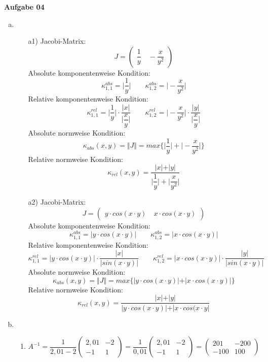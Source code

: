 \documentclass[a4paper,10pt]{article}
\begin{document}
	\newpage
	\textbf{Aufgabe 04}\\
	\begin{enumerate}[a)]
		\item
		\begin{enumerate}
			\item[a1)]
			Jacobi-Matrix:
			\[
			J = 
			\begin{pmatrix}
			\dfrac{1}{y} \quad -\dfrac{x}{y^2}
			\end{pmatrix}
			\]
			Absolute komponentenweise Kondition:
			\[
			\kappa^{abs}_{1,1} = \Big\vert \dfrac{1}{y} \Big\vert \quad\quad \kappa^{abs}_{1,2} = \Big\vert -\dfrac{x}{y^2} \Big \vert
			\]
			Relative komponentenweise Kondition:
			\[
			\kappa^{rel}_{1,1} = \Big\vert \dfrac{1}{y}\Big\vert \cdot \dfrac{\vert x \vert}{\Big \vert \dfrac{x}{y} \Big\vert} \quad\quad \kappa^{rel}_{1,2} = \Big\vert -\dfrac{x}{y^2}\Big\vert \cdot \dfrac{\vert y \vert}{\Big \vert \dfrac{x}{y} \Big\vert}
			\]
			Absolute normweise Kondition:
			\[
			\kappa_{abs}(x,y) = \Vert J \Vert = max\{\Big\vert \dfrac{1}{y} \Big\vert + \Big\vert -\dfrac{x}{y^2} \Big \vert\}
			\]
			Relative normweise Kondition:
			\[
			\kappa_{rel}(x,y) = \dfrac{\vert x \vert + \vert y \vert}{\Big\vert \dfrac{1}{y} \Big\vert + \Big\vert \dfrac{x}{y^2} \Big \vert}
			\]
			\item[a2)]
			Jacobi-Matrix:
			\[
			J = 
			\begin{pmatrix}
			y \cdot cos(x \cdot y) \quad x \cdot cos(x \cdot y)
			\end{pmatrix}
			\]
			Absolute komponentenweise Kondition:
			\[
			\kappa^{abs}_{1,1} = \Big\vert y \cdot cos(x \cdot y) \Big\vert \quad\quad \kappa^{abs}_{1,2} = \Big\vert x \cdot cos(x \cdot y) \Big \vert
			\]
			Relative komponentenweise Kondition:
			\[
			\kappa^{rel}_{1,1} = \Big\vert y \cdot cos(x \cdot y) \Big\vert \cdot \dfrac{\vert x \vert}{\Big \vert sin(x \cdot y) \Big\vert} \quad\quad \kappa^{rel}_{1,2} = \Big\vert x \cdot cos(x \cdot y) \Big\vert \cdot \dfrac{\vert y \vert}{\Big \vert sin(x \cdot y) \Big\vert}
			\]
			Absolute normweise Kondition:
			\[
			\kappa_{abs}(x,y) = \Vert J \Vert = max\{\vert y \cdot cos(x \cdot y)\vert + \vert x \cdot cos(x \cdot y) \vert\}
			\]
			Relative normweise Kondition:
			\[
			\kappa_{rel}(x,y) = \dfrac{\vert x \vert + \vert y \vert}{\vert y \cdot cos(x \cdot y) \vert + \vert x \cdot cos(x \cdot y \vert}
			\]
		\end{enumerate}
		\newpage
		\item
		\begin{enumerate}[b1)]
			\item 
			$A^{-1} = \dfrac{1}{2,01 - 2}
			\begin{pmatrix}
			2,01 & -2\\
			-1 & 1
			\end{pmatrix}
			= \dfrac{1}{0,01}
			\begin{pmatrix}
			2,01 & -2\\
			-1 & 1
			\end{pmatrix}
			=
			\begin{pmatrix}
			201 & -200\\
			-100 & 100
			\end{pmatrix}
			$\\
			

\end{enumerate}
\end{enumerate}
\end{document}
